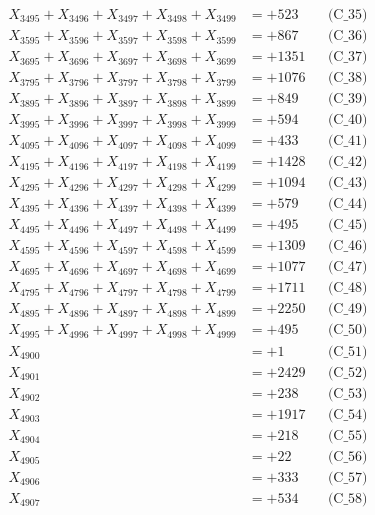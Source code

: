 \documentclass[a4paper,10pt]{article}
\begin{document}
{\begin{align}
X_{3495} + X_{3496} + X_{3497} + X_{3498} + X_{3499} &= +523 && \text{(C\_35)} \\
\allowbreak
X_{3595} + X_{3596} + X_{3597} + X_{3598} + X_{3599} &= +867 && \text{(C\_36)} \\
X_{3695} + X_{3696} + X_{3697} + X_{3698} + X_{3699} &= +1351 && \text{(C\_37)} \\
X_{3795} + X_{3796} + X_{3797} + X_{3798} + X_{3799} &= +1076 && \text{(C\_38)} \\
X_{3895} + X_{3896} + X_{3897} + X_{3898} + X_{3899} &= +849 && \text{(C\_39)} \\
X_{3995} + X_{3996} + X_{3997} + X_{3998} + X_{3999} &= +594 && \text{(C\_40)} \\
\allowbreak
X_{4095} + X_{4096} + X_{4097} + X_{4098} + X_{4099} &= +433 && \text{(C\_41)} \\
X_{4195} + X_{4196} + X_{4197} + X_{4198} + X_{4199} &= +1428 && \text{(C\_42)} \\
X_{4295} + X_{4296} + X_{4297} + X_{4298} + X_{4299} &= +1094 && \text{(C\_43)} \\
X_{4395} + X_{4396} + X_{4397} + X_{4398} + X_{4399} &= +579 && \text{(C\_44)} \\
X_{4495} + X_{4496} + X_{4497} + X_{4498} + X_{4499} &= +495 && \text{(C\_45)} \\
\allowbreak
X_{4595} + X_{4596} + X_{4597} + X_{4598} + X_{4599} &= +1309 && \text{(C\_46)} \\
X_{4695} + X_{4696} + X_{4697} + X_{4698} + X_{4699} &= +1077 && \text{(C\_47)} \\
X_{4795} + X_{4796} + X_{4797} + X_{4798} + X_{4799} &= +1711 && \text{(C\_48)} \\
X_{4895} + X_{4896} + X_{4897} + X_{4898} + X_{4899} &= +2250 && \text{(C\_49)} \\
X_{4995} + X_{4996} + X_{4997} + X_{4998} + X_{4999} &= +495 && \text{(C\_50)} \\
\allowbreak
X_{4900} &= +1 && \text{(C\_51)} \\
X_{4901} &= +2429 && \text{(C\_52)} \\
X_{4902} &= +238 && \text{(C\_53)} \\
X_{4903} &= +1917 && \text{(C\_54)} \\
X_{4904} &= +218 && \text{(C\_55)} \\
\allowbreak
X_{4905} &= +22 && \text{(C\_56)} \\
X_{4906} &= +333 && \text{(C\_57)} \\
X_{4907} &= +534 && \text{(C\_58)} \\

\end{align}}
\end{document}

